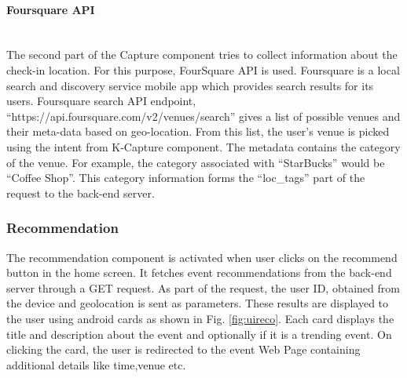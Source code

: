 \documentclass[12pt,letterpaper]{article}
\begin{document}
\paragraph{Foursquare API}\mbox{}\\
The second part of the Capture component tries to collect information about the check-in location. For this purpose, FourSquare API is used. Foursquare is a local search and discovery service mobile app which provides search results for its users. Foursquare search API endpoint, \enquote{https://api.foursquare.com/v2/venues/search} gives a list of possible venues and their meta-data based on geo-location. From this list, the user’s venue is picked using the intent from K-Capture component. The metadata contains the category of the venue. For example, the category associated with \enquote{StarBucks} would be \enquote{Coffee Shop}. This category information forms the \enquote{loc\_tags} part of the request to the back-end server.

\subsubsection{Recommendation}
The recommendation component is activated when user clicks on the recommend button in the home screen. It fetches event recommendations from the back-end server through a GET request. As part of the request, the user ID, obtained from the device and geolocation is sent as parameters. These results are displayed to the user using android cards as shown in Fig. \ref{fig:uireco}. Each card displays the title and description about the event and optionally if it is a trending event. On clicking the card, the user is redirected to the event Web Page containing additional details like time,venue etc.
\end{document}

